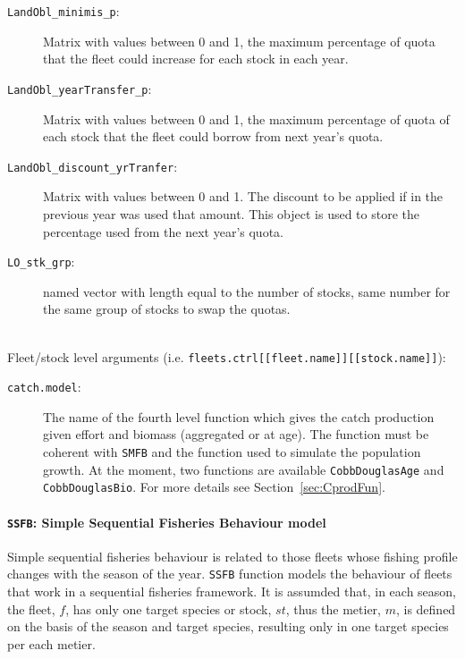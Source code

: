 \begin{description}
			\item[\texttt{LandObl\_minimis\_p}:] Matrix with values between 0 and 1, the maximum percentage of quota that 
			  the fleet could increase for each stock in each year. 
			\item[\texttt{LandObl\_yearTransfer\_p}:] Matrix with values between 0 and 1, the maximum percentage of quota 
			  of each stock that the fleet could borrow from next year's quota. 
			\item[\texttt{LandObl\_discount\_yrTranfer}:] Matrix with values between 0 and 1. 
			  The discount to be applied if in the previous year was used that amount. 
			  This object is used to store the percentage used from the next year's quota.
			\item[\texttt{LO\_stk\_grp}:] named vector with length equal to the number of stocks, 
			  same number for the same group of stocks to swap the quotas.
    \end{description}
    
  \quad\\
		Fleet/stock level arguments (i.e. \texttt{fleets.ctrl[[fleet.name]][[stock.name]]}):
	
    \begin{description}
  		\item[\texttt{catch.model}:] The name of the fourth level function which gives the catch production 
  				given effort and biomass (aggregated or at age). The function must be coherent with \texttt{SMFB}
  				and the function used to simulate the population growth. 
  				At the moment, two functions are available	\texttt{CobbDouglasAge} and \texttt{CobbDouglasBio}.
  				For more details see Section~\ref{sec:CprodFun}.
    \end{description}


\paragraph{\texttt{SSFB}: Simple Sequential Fisheries Behaviour model} \hspace{0pt} \smallskip

  Simple sequential fisheries behaviour is related to those fleets whose fishing profile changes with 
  the season of the year. \texttt{SSFB} function models the behaviour of fleets that work in a sequential 
  fisheries framework. It is assumded that, in each season, the fleet, $f$, has only one target species or 
  stock, $st$, thus the metier, $m$, is defined on the basis of the   season and target species, resulting 
  only in one target species per each metier.
  
